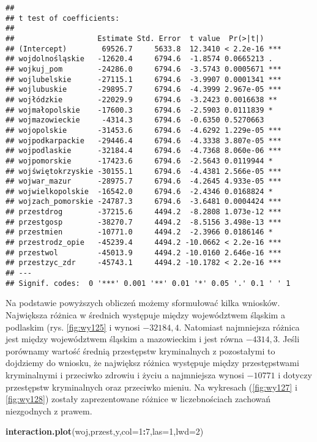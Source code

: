 \documentclass[polish,]{book}
\newenvironment{Shaded}{\begin{snugshade}}{\end{snugshade}}
\newcommand{\DataTypeTok}[1]{\textcolor[rgb]{0.13,0.29,0.53}{#1}}
\newcommand{\DecValTok}[1]{\textcolor[rgb]{0.00,0.00,0.81}{#1}}
\newcommand{\KeywordTok}[1]{\textcolor[rgb]{0.13,0.29,0.53}{\textbf{#1}}}
\newcommand{\NormalTok}[1]{#1}
\newcommand{\OperatorTok}[1]{\textcolor[rgb]{0.81,0.36,0.00}{\textbf{#1}}}
\begin{document}
\begin{verbatim}
## 
## t test of coefficients:
## 
##                   Estimate Std. Error  t value  Pr(>|t|)    
## (Intercept)        69526.7     5633.8  12.3410 < 2.2e-16 ***
## wojdolnośląskie   -12620.4     6794.6  -1.8574 0.0665213 .  
## wojkuj_pom        -24286.0     6794.6  -3.5743 0.0005671 ***
## wojlubelskie      -27115.1     6794.6  -3.9907 0.0001341 ***
## wojlubuskie       -29895.7     6794.6  -4.3999 2.967e-05 ***
## wojłódzkie        -22029.9     6794.6  -3.2423 0.0016638 ** 
## wojmałopolskie    -17600.3     6794.6  -2.5903 0.0111839 *  
## wojmazowieckie     -4314.3     6794.6  -0.6350 0.5270663    
## wojopolskie       -31453.6     6794.6  -4.6292 1.229e-05 ***
## wojpodkarpackie   -29446.4     6794.6  -4.3338 3.807e-05 ***
## wojpodlaskie      -32184.4     6794.6  -4.7368 8.060e-06 ***
## wojpomorskie      -17423.6     6794.6  -2.5643 0.0119944 *  
## wojświętokrzyskie -30155.1     6794.6  -4.4381 2.566e-05 ***
## wojwar_mazur      -28975.7     6794.6  -4.2645 4.933e-05 ***
## wojwielkopolskie  -16542.0     6794.6  -2.4346 0.0168824 *  
## wojzach_pomorskie -24787.3     6794.6  -3.6481 0.0004424 ***
## przestdrog        -37215.6     4494.2  -8.2808 1.073e-12 ***
## przestgosp        -38270.7     4494.2  -8.5156 3.498e-13 ***
## przestmien        -10771.0     4494.2  -2.3966 0.0186146 *  
## przestrodz_opie   -45239.4     4494.2 -10.0662 < 2.2e-16 ***
## przestwol         -45013.9     4494.2 -10.0160 2.646e-16 ***
## przestzyc_zdr     -45743.1     4494.2 -10.1782 < 2.2e-16 ***
## ---
## Signif. codes:  0 '***' 0.001 '**' 0.01 '*' 0.05 '.' 0.1 ' ' 1
\end{verbatim}

Na podstawie powyższych obliczeń możemy sformułować kilka wniosków. Największa
różnica w średnich występuje między województwem śląskim a podlaskim (rys. \ref{fig:wy125} i wynosi \(-32184,4\). Natomiast najmniejsza różnica jest między województwem
śląskim a mazowieckim i jest równa \(-4314,3\). Jeśli porównamy wartość średnią przestępstw kryminalnych z pozostałymi to dojdziemy do wniosku, że największ różnica
występuje między przestępstwami kryminalnymi i przeciwko zdrowiu i życiu a najmniejsza wynosi \(-10771\) i dotyczy przestępstw kryminalnych oraz przeciwko mieniu.
Na wykresach (\ref{fig:wy127} i \ref{fig:wy128}) zostały zaprezentowane różnice w liczebnościach zachowań niezgodnych z prawem.

\begin{Shaded}
\begin{Highlighting}[]
\KeywordTok{interaction.plot}\NormalTok{(woj,przest,y,}\DataTypeTok{col=}\DecValTok{1}\OperatorTok{:}\DecValTok{7}\NormalTok{,}\DataTypeTok{las=}\DecValTok{1}\NormalTok{,}\DataTypeTok{lwd=}\DecValTok{2}\NormalTok{)}
\end{Highlighting}
\end{Shaded}
\end{document}

